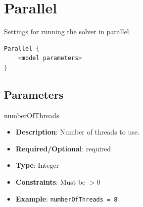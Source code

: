 \section{Parallel}

Settings for running the solver in parallel.

\begin{lstlisting}[language=C++]
Parallel {
    <model parameters>
}
\end{lstlisting}

\subsection*{Parameters}

numberOfThreads
\vspace{\the\parameterListSpacing}
\begin{itemize}
    \item {\bf Description}: Number of threads to use.
    \item {\bf Required/Optional}: required
    \item {\bf Type}: Integer
    \item {\bf Constraints}: Must be $>0$
    \item {\bf Example}: \lstinline!numberOfThreads = 8!
\end{itemize}




